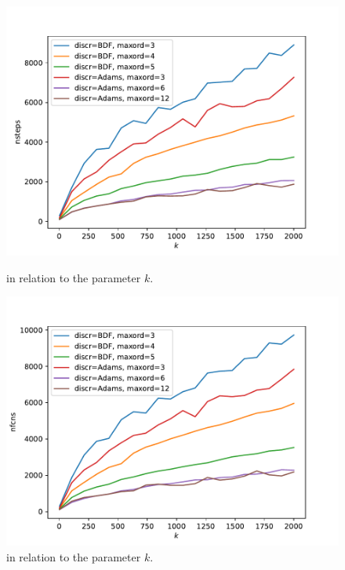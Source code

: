 \documentclass{report}
\begin{document}
\begin{figure}[h]
\centering
\begin{minipage}[b]{0.45\textwidth}
\centering
\includegraphics[width=\textwidth]{../Plots/Task4/Figure_200}
\caption{ in relation to the parameter $k$.}
\label{pl:nsteps1}
\end{minipage}
\hfill
\begin{minipage}[b]{0.45\textwidth}
\centering
\includegraphics[width=\textwidth]{../Plots/Task4/Figure_201}
\caption{ in relation to the parameter $k$.}
\label{pl:nfcns1}
\end{minipage}
\end{figure}
\end{document}
